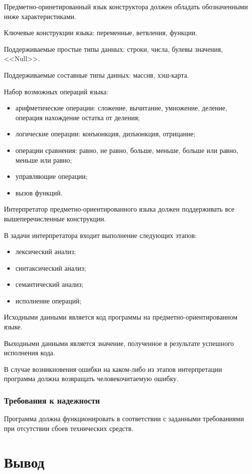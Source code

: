Предметно-оринетированный язык конструктора должен обладать обозначенными ниже характеристиками.

Ключевые конструкции языка: переменные, ветвления, функции.

Поддерживаемые простые типы данных: строки, числа, булевы значения, <<Null>>.

Поддерживаемые составные типы данных: массив, хэш-карта.

Набор возможных операций языка:
\begin{itemize}
	\item арифметические операции: сложение, вычитание, умножение, деление, операция нахождение остатка от деления;
	\item логические операции: конъюнкция, дизъюнкция, отрицание;
	\item операции сравнения: равно, не равно, больше, меньше, больше или равно, меньше или равно;
	\item управляющие операции;
	\item вызов функций.
\end{itemize}

Интерпретатор предметно-ориентированного языка должен поддерживать все вышеперечисленные конструкции.

В задачи интерпретатора входит выполнение следующих этапов:
\begin{itemize}
	\item лексический анализ;
	\item синтаксический анализ;
	\item семантический анализ;
	\item исполнение операций;
\end{itemize}

Исходными данными является код программы на предметно-ориентированном языке.

Выходными данными является значение, полученное в результате успешного исполнения кода.

В случае возникновения ошибки на каком-либо из этапов интерпретации программа должна возвращать человекочитаемую ошибку.

\subsubsection{Требования к надежности}

Программа должна функционировать в соответствии с заданными требованиями при отсутствии сбоев технических средств.

\section*{Вывод}

